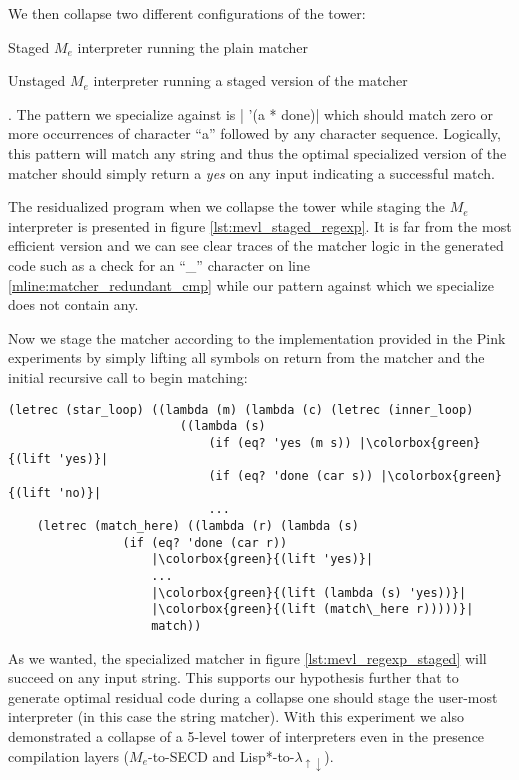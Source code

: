 \documentclass[a4paper,12pt,twoside,openright]{report}
\theoremstyle{definition}
\newcommand{\ts}{\textquotesingle}
\newcommand{\mslang}{$\lambda_{\uparrow\downarrow}$}
\newcommand{\mevl}{$M_{e}$}
\begin{document}
We then collapse two different configurations of the tower:
\begin{enumerate*}[label=(\arabic*)]
    \item Staged \mevl{} interpreter running the plain matcher
    \item Unstaged \mevl{} interpreter running a staged version of the matcher
\end{enumerate*}. The pattern we specialize against is
|    '(a * done)|
which should match zero or more occurrences of character ``a'' followed by any character sequence. Logically, this pattern will match any string and thus the optimal specialized version of the matcher should simply return a \textit{{\ts}yes} on any input indicating a successful match.

The residualized program when we collapse the tower while staging the \mevl{} interpreter is presented in figure \ref{lst:mevl_staged_regexp}. It is far from the most efficient version and we can see clear traces of the matcher logic in the generated code such as a check for an ``\_'' character on line \ref{mline:matcher_redundant_cmp} while our pattern against which we specialize does not contain any.

Now we stage the matcher according to the implementation provided in the Pink experiments \cite{amin2017collapsing} by simply lifting all symbols on return from the matcher and the initial recursive call to begin matching:
\begin{verbatim}
(letrec (star_loop) ((lambda (m) (lambda (c) (letrec (inner_loop)
                        ((lambda (s)
                            (if (eq? 'yes (m s)) |\colorbox{green}{(lift 'yes)}|
                            (if (eq? 'done (car s)) |\colorbox{green}{(lift 'no)}|
                            ...
    (letrec (match_here) ((lambda (r) (lambda (s)
                (if (eq? 'done (car r))
                    |\colorbox{green}{(lift 'yes)}|
                    ...
                    |\colorbox{green}{(lift (lambda (s) 'yes))}|
                    |\colorbox{green}{(lift (match\_here r)))))}|
                    match))
\end{verbatim}
As we wanted, the specialized matcher in figure \ref{lst:mevl_regexp_staged} will succeed on any input string. This supports our hypothesis further that to generate optimal residual code during a collapse one should stage the user-most interpreter (in this case the string matcher). With this experiment we also demonstrated a collapse of a 5-level tower of interpreters even in the presence compilation layers (\mevl-to-SECD and Lisp*-to-\mslang).
\end{document}
